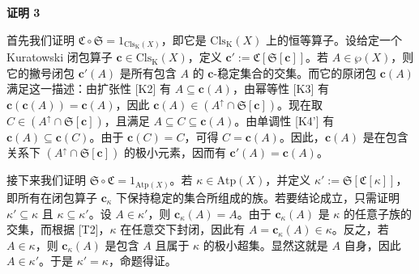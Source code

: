 \textbf{证明 3}

首先我们证明 ${\mathfrak{C}} \circ {\mathfrak{S}} = {\mathfrak{1}}_{\mathrm{Cls}_{\text{K}}(X)}$，即它是 $\mathrm{Cls}_{\text{K}}(X)$ 上的恒等算子。设给定一个 Kuratowski 闭包算子 $\mathbf{c} \in \mathrm{Cls}_{\text{K}}(X)$，定义 $\mathbf{c}' := {\mathfrak{C}}[{\mathfrak{S}}[\mathbf{c}]]$。若 $A \in \wp(X)$，则它的撇号闭包 $\mathbf{c}'(A)$ 是所有包含 $A$ 的 $\mathbf{c}$-稳定集合的交集。而它的原闭包 $\mathbf{c}(A)$ 满足这一描述：由扩张性 [K2] 有 $A \subseteq \mathbf{c}(A)$，由幂等性 [K3] 有 $\mathbf{c}(\mathbf{c}(A)) = \mathbf{c}(A)$，因此 $\mathbf{c}(A) \in (A^{\uparrow} \cap {\mathfrak{S}}[\mathbf{c}])$。现在取 $C \in (A^{\uparrow} \cap {\mathfrak{S}}[\mathbf{c}])$，且满足 $A \subseteq C \subseteq \mathbf{c}(A)$。由单调性 [K4'] 有 $\mathbf{c}(A) \subseteq \mathbf{c}(C)$。由于 $\mathbf{c}(C) = C$，可得 $C = \mathbf{c}(A)$。因此，$\mathbf{c}(A)$ 是在包含关系下 $(A^{\uparrow} \cap {\mathfrak{S}}[\mathbf{c}])$ 的极小元素，因而有 $\mathbf{c}'(A) = \mathbf{c}(A)$。

接下来我们证明 ${\mathfrak{S}} \circ {\mathfrak{C}} = {\mathfrak{1}}_{\mathrm{Atp}(X)}$。若 $\kappa \in \mathrm{Atp}(X)$，并定义 $\kappa' := {\mathfrak{S}}[{\mathfrak{C}}[\kappa]]$，即所有在闭包算子 $\mathbf{c}_{\kappa}$ 下保持稳定的集合所组成的族。若要结论成立，只需证明 $\kappa' \subseteq \kappa$ 且 $\kappa \subseteq \kappa'$。设 $A \in \kappa'$，则 $\mathbf{c}_{\kappa}(A) = A$。由于 $\mathbf{c}_{\kappa}(A)$ 是 $\kappa$ 的任意子族的交集，而根据 [T2]，$\kappa$ 在任意交下封闭，因此有 $A = \mathbf{c}_{\kappa}(A) \in \kappa$。反之，若 $A \in \kappa$，则 $\mathbf{c}_{\kappa}(A)$ 是包含 $A$ 且属于 $\kappa$ 的极小超集。显然这就是 $A$ 自身，因此 $A \in \kappa'$。于是 $\kappa' = \kappa$，命题得证。
